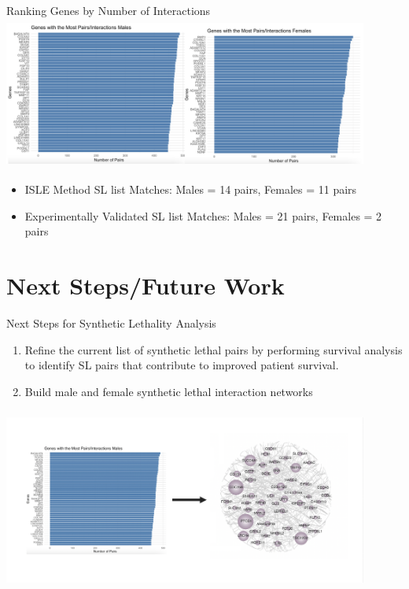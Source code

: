 \documentclass{beamer}
\begin{document}
	\begin{frame}{Ranking Genes by Number of Interactions}
		\includegraphics[width=12cm, height=5cm]{interactions.png}
		
		\begin{itemize}
		\item ISLE Method SL list Matches: Males = 14 pairs, Females = 11 pairs
		\item Experimentally Validated SL list Matches: Males = 21 pairs, Females = 2 pairs
		\end{itemize}
	\end{frame}

	\section{Next Steps/Future Work}
	\begin{frame}{Next Steps for Synthetic Lethality Analysis}
		\begin{enumerate}
			\item Refine the current list of synthetic lethal pairs by performing survival analysis to identify SL pairs that contribute to improved patient survival.
			\item Build male and female synthetic lethal interaction networks	
		\end{enumerate}
	\includegraphics[width=12cm, height=6cm]{network_interactions.png}
	\end{frame}
\end{document}
